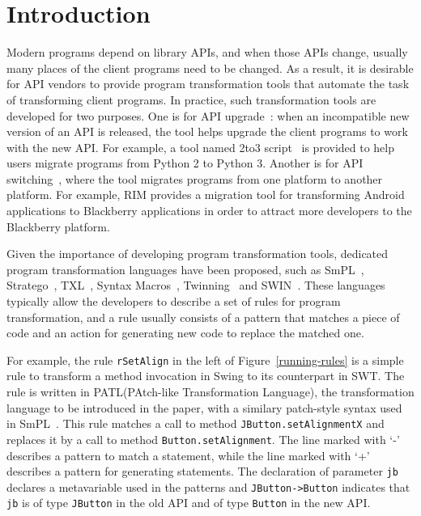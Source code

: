 \documentclass[letterpaper, USenglish]{lipics-v2016}
\newcommand{\code}[1]{\texttt{\footnotesize #1}}
\newcommand{\PATL}{PATL\xspace}
\theoremstyle{plain}
\begin{document}
\section{Introduction}
\label{sec:intro}
Modern programs depend on library APIs, and when those APIs change, usually
many places of the client programs need to be changed. As a result, it
is desirable for API vendors to provide program transformation tools
that automate the task of transforming client programs. 
In practice, such transformation tools are developed for two purposes.
One is for API upgrade~\cite{Dig:2006:AES:1133105.1133107,Li:2013:WSA:2514946.2515486}: when an incompatible new version of an API is released, the tool helps upgrade the client programs to work with the new
API. For example, a tool named 2to3 script~\cite{Pilgrim:2009:DP:1655836} is provided to
help users migrate programs from Python 2 to Python 3. Another is for
API switching~\cite{246}, where the tool migrates programs from
one platform to another platform. For example, RIM provides a
migration tool for transforming Android applications to Blackberry
applications in order to attract more developers to the Blackberry
platform. 

Given the importance of developing program transformation tools,
dedicated program transformation languages have been proposed, such as SmPL~\cite{DBLP:conf/eurosys/PadioleauLHM08}, Stratego~\cite{Bravenboer:2008:SLT:1385689.1385715},
TXL~\cite{Cordy:2006:TST:1149670.1149672}, Syntax Macros~\cite{Weise:1993:PSM:155090.155105}, Twinning~\cite{Nita:2010:UTA:1806799.1806832} and SWIN~\cite{Li:2015:STT:2678015.2682534}. These languages typically allow
the developers to describe a set of rules for program transformation, and a rule usually consists of a pattern that matches a piece of code and an action for generating new code to replace the matched one. 

For example, the rule \code{rSetAlign} in the left of Figure~\ref{running-rules} is a simple rule to transform a method invocation in Swing to its counterpart in SWT. The rule is written in \PATL (PAtch-like Transformation Language), the transformation language to be introduced in the paper, with a similary patch-style syntax used in SmPL~\cite{DBLP:conf/eurosys/PadioleauLHM08}. This rule matches a call to method \code{JButton.setAlignmentX} and replaces it by
a call to method \code{Button.setAlignment}. The line marked with `-' describes a
pattern to match a statement, while the line marked with `+' describes
a pattern for generating statements. 
The declaration of parameter \code{jb} declares a metavariable used in the patterns and \code{JButton->Button} indicates that \code{jb} is of type \code{JButton} in the old API and of type \code{Button} in the new API.
\end{document}
